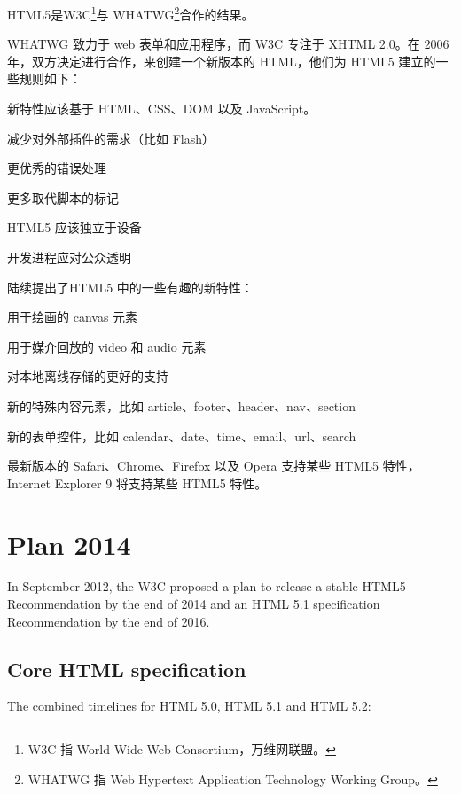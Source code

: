 HTML5是W3C\footnote{W3C 指 World Wide Web Consortium，万维网联盟。}与 WHATWG\footnote{WHATWG 指 Web Hypertext Application Technology Working Group。}合作的结果。

WHATWG 致力于 web 表单和应用程序，而 W3C 专注于 XHTML 2.0。在 2006 年，双方决定进行合作，来创建一个新版本的 HTML，他们为 HTML5 建立的一些规则如下：

\begin{compactitem}
\item 新特性应该基于 HTML、CSS、DOM 以及 JavaScript。
\item 减少对外部插件的需求（比如 Flash）
\item 更优秀的错误处理
\item 更多取代脚本的标记
\item HTML5 应该独立于设备
\item 开发进程应对公众透明
\end{compactitem}


陆续提出了HTML5 中的一些有趣的新特性：

\begin{compactitem}
\item 用于绘画的 canvas 元素
\item 用于媒介回放的 video 和 audio 元素
\item 对本地离线存储的更好的支持
\item 新的特殊内容元素，比如 article、footer、header、nav、section
\item 新的表单控件，比如 calendar、date、time、email、url、search
\end{compactitem}

最新版本的 Safari、Chrome、Firefox 以及 Opera 支持某些 HTML5 特性，Internet Explorer 9 将支持某些 HTML5 特性。




\section{Plan 2014}

In September 2012, the W3C proposed a plan to release a stable HTML5 Recommendation by the end of 2014 and an HTML 5.1 specification Recommendation by the end of 2016.

\subsection{Core HTML specification}

The combined timelines for HTML 5.0, HTML 5.1 and HTML 5.2:

